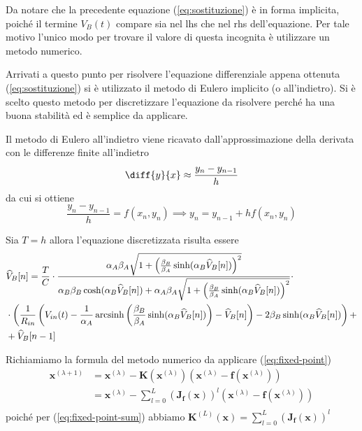 	Da notare che la precedente equazione (\ref{eq:sostituzione}) è in forma implicita, poiché il termine $V_{B}(t)$ compare sia nel lhs che nel rhs dell'equazione. Per tale motivo l'unico modo per trovare il valore di questa incognita è utilizzare un metodo numerico.
	
	Arrivati a questo punto per risolvere l'equazione differenziale appena ottenuta (\ref{eq:sostituzione}) si è utilizzato il metodo di Eulero implicito (o all'indietro). Si è scelto questo metodo per discretizzare l'equazione da risolvere perché ha una buona stabilità ed è semplice da applicare.
	
	Il metodo di Eulero all'indietro viene ricavato dall'approssimazione della derivata con le differenze finite all'indietro
	\[
		\diff{y}{x} \approx \frac{y_{n}-y_{n-1}}{h}
	\]
	da cui si ottiene
	\[
		\frac{y_{n}-y_{n-1}}{h} = f(x_{n},y_{n}) \implies y_{n} = y_{n-1}+hf(x_{n},y_{n})
	\]
	
	Sia $T = h$ allora l'equazione discretizzata risulta essere
	\begin{equation}
		\label{eq:discretizzazione}
		\begin{split}
			&\widehat V_{B}[n] = \frac{T}{C}\cdot\frac{\alpha_{A}\beta_{A}\sqrt{1+\left(\frac{\beta_{B}}{\beta_{A}}\sinh(\alpha_{B}\widehat V_{B}[n])\right)^{2}}}{\alpha_{B}\beta_{B}\cosh(\alpha_{B}\widehat V_{B}[n])+\alpha_{A}\beta_{A}\sqrt{1+\left(\frac{\beta_{B}}{\beta_{A}}\sinh(\alpha_{B}\widehat V_{B}[n])\right)^{2}}}\cdot\\&\cdot\left(\frac{1}{R_{in}}\left(V_{in}(t)-\frac{1}{\alpha_{A}} \operatorname{arcsinh} \left(\frac{\beta_{B}}{\beta_{A}} \sinh(\alpha_{B}\widehat V_{B}[n])\right)-\widehat V_{B}[n]\right)-2\beta_{B}\sinh(\alpha_{B}\widehat V_{B}[n])\right)+\\&+\widehat V_{B}[n-1]\\
		\end{split}
	\end{equation}
	\pagebreak
	
	Richiamiamo la formula del metodo numerico da applicare (\ref{eq:fixed-point})
	\begin{equation}
		\label{eq:punto_fisso1}
		\begin{split}
			\mathbf{x}^{(\lambda+1)} &= \mathbf{x}^{(\lambda)}-\mathbf{K}(\mathbf{x}^{(\lambda)})(\mathbf{x}^{(\lambda)}-\mathbf{f}(\mathbf{x}^{(\lambda)}))\\
			&= \mathbf{x}^{(\lambda)}-\sum_{l=0}^{L} \left(\mathbf{J_{f}(x)}\right)^{l}(\mathbf{x}^{(\lambda)}-\mathbf{f}(\mathbf{x}^{(\lambda)}))\\
		\end{split}
	\end{equation}
	poiché per (\ref{eq:fixed-point-sum}) abbiamo $\mathbf{K}^{(L)}(\mathbf{x}) = \sum_{l=0}^{L} \left(\mathbf{J_{f}(x)}\right)^{l}$\\
	
